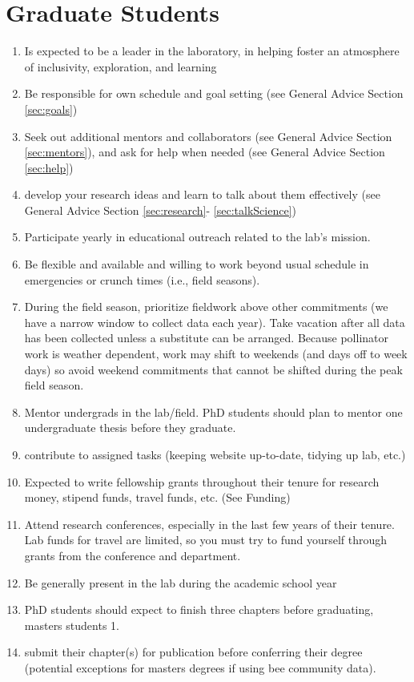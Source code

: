 \documentclass[12pt]{article}
\begin{document}
\section{Graduate Students}
\begin{enumerate}
\item Is expected to be a leader in the laboratory, in helping foster
  an atmosphere of inclusivity, exploration, and  learning
\item Be responsible for own schedule and goal setting (see General Advice
  Section \ref{sec:goals})
\item Seek out additional mentors and collaborators (see General
  Advice Section \ref{sec:mentors}), and ask for help when needed (see
  General Advice Section \ref{sec:help})
\item develop your research ideas and learn to talk about them
  effectively (see General Advice Section \ref{sec:research}-
  \ref{sec:talkScience})
 \item Participate yearly in educational outreach related to the lab's mission.
\item Be flexible and available and willing to work beyond usual
  schedule in emergencies or crunch times (i.e., field seasons).
 \item During the field season, prioritize fieldwork above other
   commitments (we have a narrow window to collect data each
   year). Take vacation after all data has been collected unless a
   substitute can be arranged. Because pollinator work is weather
   dependent, work may shift to weekends (and days off to week days)
   so avoid weekend commitments that cannot be shifted during the peak
   field season.
\item Mentor undergrads in the lab/field. PhD students should plan to
  mentor one undergraduate thesis before they graduate.
\item contribute to assigned tasks (keeping website up-to-date,
  tidying up lab, etc.)
\item Expected to write fellowship grants throughout their tenure for
  research money, stipend funds, travel funds, etc. (See Funding)
\item Attend research conferences, especially in the last few years of
  their tenure. Lab funds for travel are limited, so you must try to
  fund yourself through grants from the conference and department.
\item Be generally present in the lab during the academic school year
\item PhD students should expect to finish three chapters before
  graduating, masters students 1. 
\item submit their chapter(s) for publication before conferring their
  degree (potential exceptions for masters degrees if using bee
  community data).
\end{enumerate}
\end{document}
